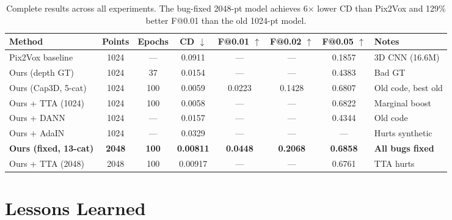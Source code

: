 \documentclass[10pt,twocolumn,letterpaper]{article}
\begin{document}
\begin{table}[t]
\centering
\small
\begin{tabular}{@{}lccccccl@{}}
\toprule
\textbf{Method} & \textbf{Points} & \textbf{Epochs} & \textbf{CD $\downarrow$} & \textbf{F@0.01 $\uparrow$} & \textbf{F@0.02 $\uparrow$} & \textbf{F@0.05 $\uparrow$} & \textbf{Notes} \\
\midrule
Pix2Vox baseline & 1024 & --- & 0.0911 & --- & --- & 0.1857 & 3D CNN (16.6M) \\
Ours (depth GT) & 1024 & 37 & 0.0154 & --- & --- & 0.4383 & Bad GT \\
Ours (Cap3D, 5-cat) & 1024 & 100 & 0.0059 & 0.0223 & 0.1428 & 0.6807 & Old code, best old \\
Ours + TTA (1024) & 1024 & 100 & 0.0058 & --- & --- & 0.6822 & Marginal boost \\
Ours + DANN & 1024 & --- & 0.0157 & --- & --- & 0.4344 & Old code \\
Ours + AdaIN & 1024 & --- & 0.0329 & --- & --- & --- & Hurts synthetic \\
\midrule
\textbf{Ours (fixed, 13-cat)} & \textbf{2048} & \textbf{100} & \textbf{0.00811} & \textbf{0.0448} & \textbf{0.2068} & \textbf{0.6858} & \textbf{All bugs fixed} \\
Ours + TTA (2048) & 2048 & 100 & 0.00917 & --- & --- & 0.6761 & TTA hurts \\
\bottomrule
\end{tabular}
\caption{Complete results across all experiments. The bug-fixed 2048-pt model achieves 6$\times$ lower CD than Pix2Vox and 129\% better F@0.01 than the old 1024-pt model.}
\end{table}

\section{Lessons Learned}
\end{document}
